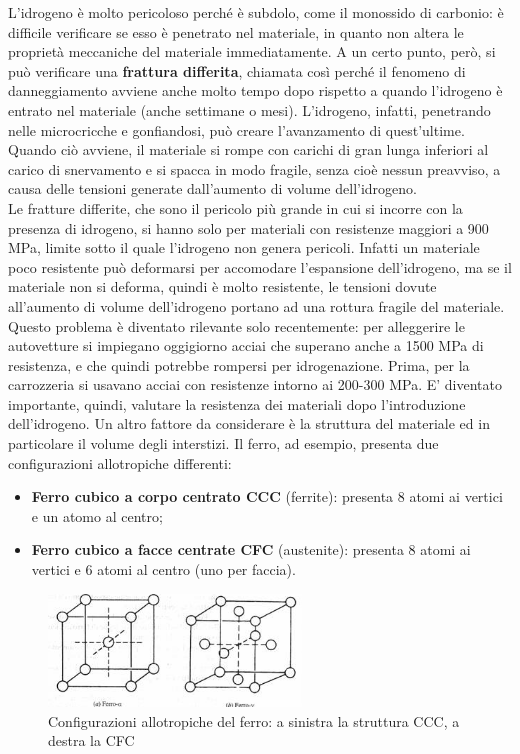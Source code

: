 L’idrogeno è molto pericoloso perché è subdolo, come il monossido di carbonio: è difficile verificare se esso è penetrato nel materiale, in quanto non altera le proprietà meccaniche del materiale immediatamente. A un certo punto, però, si può verificare una \textbf{frattura differita}, chiamata così perché il fenomeno di danneggiamento avviene anche molto tempo dopo rispetto a quando l’idrogeno è entrato nel materiale (anche settimane o mesi). L’idrogeno, infatti, penetrando nelle microcricche e gonfiandosi, può creare l’avanzamento di quest’ultime. Quando ciò avviene, il materiale si rompe con carichi di gran lunga inferiori al carico di snervamento e si spacca in modo fragile, senza cioè nessun preavviso, a causa delle tensioni generate dall'aumento di volume dell'idrogeno.\\
Le fratture differite, che sono il pericolo più grande in cui si incorre con la presenza di idrogeno, si hanno solo per materiali con resistenze maggiori a 900 MPa, limite sotto il quale l’idrogeno non genera pericoli. Infatti un materiale poco resistente può deformarsi per accomodare l'espansione dell'idrogeno, ma se il materiale non si deforma, quindi è molto resistente, le tensioni dovute all’aumento di volume dell’idrogeno portano ad una rottura fragile del materiale. Questo problema è diventato rilevante solo recentemente: per alleggerire le autovetture si impiegano oggigiorno acciai che superano anche a 1500 MPa di resistenza, e che quindi potrebbe rompersi per idrogenazione. Prima, per la carrozzeria si usavano acciai con resistenze intorno ai 200-300 MPa. E’ diventato importante, quindi, valutare la resistenza dei materiali dopo l’introduzione dell’idrogeno.
Un altro fattore da considerare è la struttura del materiale ed in particolare il volume degli interstizi.
Il ferro, ad esempio, presenta due configurazioni allotropiche differenti:
\begin{itemize}
\item \textbf{Ferro cubico a corpo centrato CCC} (ferrite): presenta 8 atomi ai vertici e un atomo al centro;
    \item \textbf{Ferro cubico a facce centrate CFC} (austenite): presenta 8 atomi ai vertici e 6 atomi al centro (uno per faccia).
\end{itemize}
\begin{figure}[!hbt]
	\includegraphics[width=0.6\textwidth]{images/img4.png}
	\caption[Configurazioni allotropiche ferro]{Configurazioni allotropiche del ferro: a sinistra la struttura CCC, a destra la CFC}
\end{figure}
